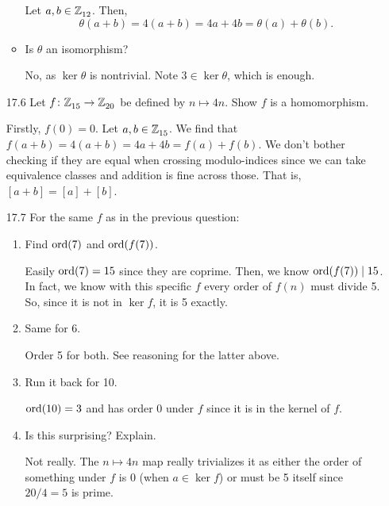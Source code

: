 \documentclass{article}
\begin{document}
\begin{enumerate}[start=0,label={RELABEL}]
\begin{itemize}
                Let $a, b \in \mathbb{Z}^{}_{12}$. Then,
                \[ \theta(a + b) = 4(a + b) = 4a + 4b = \theta(a) + \theta(b). \]

          \item Is $\theta$ an isomorphism?

                No, as $\ker \theta$ is nontrivial. Note $3 \in \ker \theta$, which is enough.
        \end{itemize}


  \item[17.6\rparen] Let $f \colon \mathbb{Z}^{}_{15} \to \mathbb{Z}^{}_{20}$ be defined by $n \mapsto 4n$. Show $f$ is a homomorphism.

        Firstly, $f(0) = 0$. Let $a, b \in \mathbb{Z}^{}_{15}$.
        We find that $f(a + b) = 4(a + b) = 4a + 4b = f(a) + f(b)$.
        We don't bother checking if they are equal when crossing modulo-indices since we can take equivalence classes and addition is fine across those.
        That is, $[a + b] = [a] + [b]$.

  \item[17.7\rparen] For the same $f$ as in the previous question:

        \begin{enumerate}[start=1,label={(\alph*)}]
          \item Find $\operatorname{ord}(7)$ and $\operatorname{ord}(f(7))$.

                Easily $\operatorname{ord}(7) = 15$ since they are coprime.
                Then, we know $\operatorname{ord}(f(7)) \mid 15$.
                In fact, we know with this specific $f$ every order of $f(n)$ must divide 5. So, since it is not in $\ker f$, it is 5 exactly.

          \item Same for 6.

                Order 5 for both. See reasoning for the latter above.

          \item Run it back for 10.

                $\operatorname{ord}(10) = 3$ and has order 0 under $f$ since it is in the kernel of $f$.

          \item Is this surprising? Explain.

                Not really. The $n \mapsto 4n$ map really trivializes it as either the order of something under $f$ is 0 (when $a \in \ker f$)
                or must be 5 itself since $20/4 = 5$ is prime.
        \end{enumerate}



\end{enumerate}
\end{document}
